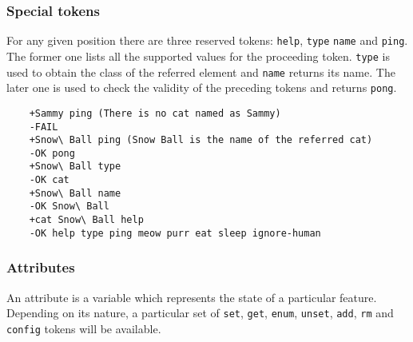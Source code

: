 \documentclass[../main.tex]{subfiles}
\begin{document}
\subsubsection{Special tokens}
For any given position there are three reserved tokens: \texttt{help}, \texttt{type} \texttt{name} and \texttt{ping}. The former one lists all the supported values for the proceeding token. \texttt{type} is used to obtain the class of the referred element and \texttt{name} returns its name. The later one is used to check the validity of the preceding tokens and returns \texttt{pong}.

\begin{lstlisting}
    +Sammy ping (There is no cat named as Sammy)
    -FAIL
    +Snow\ Ball ping (Snow Ball is the name of the referred cat)
    -OK pong
    +Snow\ Ball type
    -OK cat
    +Snow\ Ball name
    -OK Snow\ Ball
    +cat Snow\ Ball help
    -OK help type ping meow purr eat sleep ignore-human

\end{lstlisting}

\subsubsection{Attributes}
An attribute is a variable which represents the state of a particular feature. Depending on its nature, a particular set of \texttt{set}, \texttt{get}, \texttt{enum}, \texttt{unset}, \texttt{add}, \texttt{rm} and \texttt{config} tokens will be available. 
\end{document}
